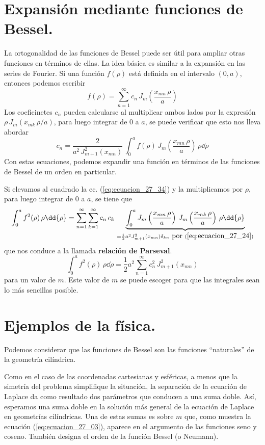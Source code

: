 \section{Expansión mediante funciones de Bessel.}
La ortogonalidad de las funciones de Bessel puede ser útil para ampliar otras funciones en términos de ellas. La idea básica es similar a la expansión en las series de Fourier. Si una función $f(\rho)$ está definida en el intervalo $(0, a)$, entonces podemos escribir
\begin{equation}
f(\rho) = \sum_{n=1}^{\infty} c_{n} \, J_{m} \left( \dfrac{x_{mn}\, \rho}{a} \right)
\label{eq:ecuacion_27_34}
\end{equation}
Los coeficinetes $c_{n}$ pueden calcularse al multiplicar ambos lados por la expresión $\rho \, J_{m}(x_{mk} \, \rho/a)$, para luego integrar de $0$ a $a$, se puede verificar que esto nos lleva abordar
\begin{equation}
c_{n} = \dfrac{2}{a^{2} \, J_{m+1}^{2} (x_{mn})} \, \int_{0}^{a} f (\rho) \, J_{m} \left( \dfrac{x_{mn} \, \rho}{a} \right) \, \rho \dd{\rho}
\label{eq:ecuacion_27_35}
\end{equation}
Con estas ecuaciones, podemos expandir una función en términos de las funciones de Bessel de un orden en particular.
\par
Si elevamos al cuadrado la ec. (\ref{eq:ecuacion_27_34}) y la multiplicamos por $\rho$, para luego integrar de $0$ a $a$, se tiene que
\begin{align*}
\int_{0}^{a} f^{2} (\rho) \, \rho \dd{\rho} = \sum_{n=1}^{\infty} \sum_{k=1}^{\infty} c_{n} \, c_{k} \, \underbrace{\int_{0}^{a} J_{m} \left( \dfrac{x_{mn} \, \rho}{a} \right) \, J_{m} \left( \dfrac{x_{mk} \, \rho}{a} \right) \, \rho \dd{\rho}}_{=\frac{1}{2} a^{2} J_{m+1}^{2} (x_{mn}) \delta_{kn} \mbox{ por } (\ref{eq:ecuacion_27_24})}
\end{align*}
que nos conduce a la llamada \textbf{relación de Parseval}.
\begin{equation}
\int_{0}^{a} f^{2} (\rho) \, \rho \dd{\rho} = \dfrac{1}{2} a^{2} \sum_{n=1}^{\infty} c_{n}^{2} \, J_{m+1}^{2} (x_{mn})
\label{eq:ecuacion_27_38}
\end{equation}
para un valor de $m$. Este valor de $m$ se puede escoger para que las integrales sean lo más sencillas posible.
\section{Ejemplos de la física.}
Podemos considerar que las funciones de Bessel son las funciones \enquote{naturales} de la geometría cilíndrica.
\par
Como en el caso de las coordenadas cartesianas y esféricas, a menos que la simetría del problema simplifique la situación, la separación de la ecuación de Laplace da como resultado dos parámetros que conducen a una suma doble. Así, esperamos una suma doble en la solución más general de la ecuación de Laplace en geometrías cilíndricas. Una de estas sumas es sobre $m$ que, como muestra la ecuación (\ref{eq:ecuacion_27_03}), aparece en el argumento de las funciones seno y coseno. También designa el orden de la función Bessel (o Neumann).
\par
